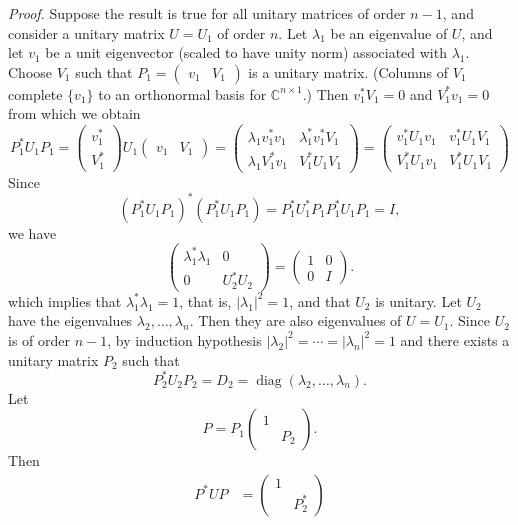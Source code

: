 \documentclass{mathproblems}
\newcommand\C{\mathbb{C}}
\begin{document}
\begin{questions}
\textit{Proof.} Suppose the result is true for all unitary matrices of order $n-1$, and consider a unitary matrix $U=U_1$ of order $n$. Let $\lambda_1$ be an eigenvalue of $U$, and let $v_1$ be a unit eigenvector (scaled to have unity norm) associated with $\lambda_1$. Choose $V_1$ such that $P_1=\begin{pmatrix} v_1 & V_1 \end{pmatrix}$ is a unitary matrix. (Columns of $V_1$ complete $\{v_1\}$ to an orthonormal basis for $\C^{n \times 1}$.) Then $v_1^* V_1=0$ and $V_1^* v_1=0$ from which we obtain
$$
P_1^* U_1 P_1 =\begin{pmatrix}
v_1^* \\
V_1^*
\end{pmatrix} U_1 \begin{pmatrix} v_1 & V_1 \end{pmatrix} =\begin{pmatrix}
\lambda_1 v_1^* v_1 & \lambda_1^* v_1^* V_1 \\
\lambda_1 V_1^* v_1 & V_1^* U_1 V_1
\end{pmatrix}=\begin{pmatrix}
v_1^* U_1 v_1 & v_1^* U_1 V_1 \\
V_1^* U_1 v_1 & V_1^* U_1 V_1
\end{pmatrix}
$$
Since
$$
(P_1^* U_1 P_1)^*(P_1^* U_1 P_1)=P_1^* U_1^* P_1 P_1^* U_1 P_1=I,
$$
we have
$$
\begin{pmatrix}
\lambda_1^* \lambda_1 & 0 \\
0 & U_2^* U_2
\end{pmatrix}=\begin{pmatrix}
1 & 0 \\
0 & I
\end{pmatrix}.
$$
which implies that $\lambda_1^* \lambda_1=1$, that is, $\left|\lambda_1\right|^2=1$, and that $U_2$ is unitary. Let $U_2$ have the eigenvalues $\lambda_2, \ldots, \lambda_n$. Then they are also eigenvalues of $U=U_1$. Since $U_2$ is of order $n-1$, by induction hypothesis $\left|\lambda_2\right|^2=\cdots=|\lambda_n|^2=1$ and there exists a unitary matrix $P_2$ such that
$$
P_2^* U_2 P_2=D_2=\operatorname{diag}(\lambda_2, \ldots, \lambda_n).
$$
Let
$$
P=P_1\begin{pmatrix}
1 & \\
& P_2
\end{pmatrix}.
$$
Then
$$
\begin{aligned}
P^* U P &=\begin{pmatrix}
1 & \\
& P_2^*

\end{pmatrix}
\end{aligned}$$
\end{questions}
\end{document}
